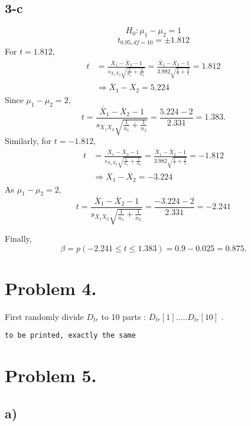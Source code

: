 \documentclass[10pt,a4paper]{article}
\begin{document}
\subsection*{3-c}

\[
H_0 : \mu_1 - \mu_2 = 1
\]
\[
t_{0.95, df = 10} = \pm 1.812
\]
For $t =1.812$,
\begin{align*}
  t &= \frac{\overline{X}_1 - \overline{X}_2 - 1}
  {s_{X_1 X_2} \sqrt{\frac{1}{n_1} + \frac{1}{n_2}}}
  = \frac{\overline{X}_1 - \overline{X}_2 - 1}
  {3.982 \sqrt{\frac{1}{7} + \frac{1}{5}}} = 1.812 \\
  &\Rightarrow
  \overline{X}_1 - \overline{X}_2 = 5.224
\end{align*}
Since $\mu_1 - \mu_2 = 2$,
\[
t = \frac{\overline{X}_1 - \overline{X}_2 - 1}
  {s_{X_1 X_2} \sqrt{\frac{1}{n_1} + \frac{1}{n_2}}} =
  \frac{5.224 - 2}{2.331} = 1.383
.\]
Similarly, for $t = -1.812$,
\begin{align*}
 t &= \frac{\overline{X}_1 - \overline{X}_2 - 1}
  {s_{X_1 X_2} \sqrt{\frac{1}{n_1} + \frac{1}{n_2}}}
  = \frac{\overline{X}_1 - \overline{X}_2 - 1}
  {3.982 \sqrt{\frac{1}{7} + \frac{1}{5}}} = -1.812 \\
  &\Rightarrow
  \overline{X}_1 - \overline{X}_2 = -3.224 
\end{align*}
As $\mu_1 - \mu_2 = 2$,   
\[
t = \frac{\overline{X}_1 - \overline{X}_2 - 1}
  {s_{X_1 X_2} \sqrt{\frac{1}{n_1} + \frac{1}{n_2}}} =
  \frac{-3.224 - 2}{2.331} = -2.241
\]

\noindent
Finally,
\[
\beta = p(-2.241 \le t \le 1.383) = 0.9 - 0.025 = 0.875
.\]


\newpage
\section*{Problem 4.}
First randomly divide $D_{tr}$ to 10 parts : $ D_{tr}[1].....D_{tr}[10]$ .
\begin{verbatim}
to be printed, exactly the same
\end{verbatim}
  

\section*{Problem 5.}


\subsection*{a)}
\end{document}
